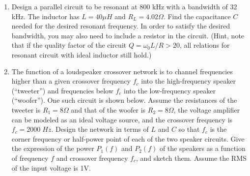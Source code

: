 \begin{enumerate}
\item Design a parallel circuit to be resonant at 800 kHz with a bandwidth
of 32 kHz. The inductor has $L=40 \mu H$ and $R_L=4.02 \Omega$. Find the
capacitance $C$ needed for the desired resonant frequency. In order to
satisfy the desired bandwidth, you may also need to include a resistor 
in the circuit. (Hint, note that if the quality factor of the circuit
$Q=\omega_0 L/R > 20$, all relations for resonant circuit with ideal
inductor still hold.)



\item The function of a loudspeaker crossover network is to channel 
frequencies higher than a given crossover frequency $f_c$ into the
high-frequency speaker (``tweeter'') and frequencies below $f_c$ into
the low-frequency speaker (``woofer''). One such circuit is shown below.
Assume the resistances of the tweeter is $R_1=8\Omega$ and that of the 
woofer is $R_2=8\Omega$, the voltage amplifier can be modeled as an
ideal voltage source, and the crossover frequency is $f_c=2000\; Hz$.
Design the network in terms of $L$ and $C$ so that $f_c$ is the corner
frequency or half-power point of each of the two speaker circuits. Give 
the expression of the power $P_1(f)$ and $P_2(f)$ of the speakers as a 
function of frequency $f$ and crossover frequency $f_c$, and sketch them.
Assume the RMS of the input voltage is 1V.


% 


\end{enumerate}




